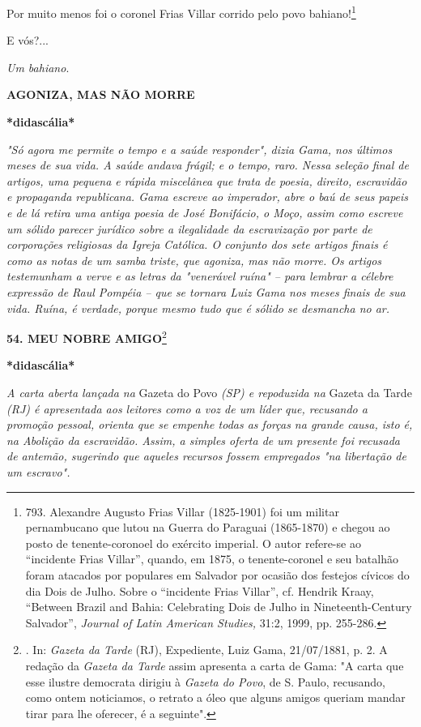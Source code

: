 Por muito menos foi o coronel Frias Villar corrido pelo povo
bahiano!\footnote{793. Alexandre Augusto Frias Villar (1825-1901) foi um
  militar pernambucano que lutou na Guerra do Paraguai (1865-1870) e
  chegou ao posto de tenente-coronoel do exército imperial. O autor
  refere-se ao ``incidente Frias Villar'', quando, em 1875, o
  tenente-coronel e seu batalhão foram atacados por populares em
  Salvador por ocasião dos festejos cívicos do dia Dois de Julho. Sobre
  o ``incidente Frias Villar'', cf. Hendrik Kraay, ``Between Brazil and
  Bahia: Celebrating Dois de Julho in Nineteenth-Century Salvador'',
  \emph{Journal of Latin American Studies,} 31:2, 1999, pp. 255-286.}

E vós?...

\emph{Um bahiano}.

\textbf{AGONIZA, MAS NÃO
MORRE}

\textbf{*didascália*}

\emph{"Só agora me permite o tempo e a saúde responder", dizia Gama, nos
últimos meses de sua vida. A saúde andava frágil; e o tempo, raro. Nessa
seleção final de artigos, uma pequena e rápida miscelânea que trata de
poesia, direito, escravidão e propaganda republicana. Gama escreve ao
imperador, abre o baú de seus papeis e de lá retira uma antiga poesia de
José Bonifácio, o Moço, assim como escreve um sólido parecer jurídico
sobre a ilegalidade da escravização por parte de corporações religiosas
da Igreja Católica. O conjunto dos sete artigos finais é como as notas
de um samba triste, que agoniza, mas não morre. Os artigos testemunham a
verve e as letras da "venerável ruína" -- para lembrar a célebre
expressão de Raul Pompéia -- que se tornara Luiz Gama nos meses finais
de sua vida. Ruína, é verdade, porque mesmo tudo que é sólido se
desmancha no ar.}

\textbf{54. MEU NOBRE AMIGO}\footnote{. In: \emph{Gazeta da Tarde} (RJ),
  Expediente, Luiz Gama, 21/07/1881, p. 2. A redação da \emph{Gazeta da
  Tarde} assim apresenta a carta de Gama: "A carta que esse ilustre
  democrata dirigiu à \emph{Gazeta do Povo}, de S. Paulo, recusando,
  como ontem noticiamos, o retrato a óleo que alguns amigos queriam
  mandar tirar para lhe oferecer, é a seguinte".}

\textbf{*}\textbf{didascália*}

\emph{A carta aberta lançada na} Gazeta do Povo \emph{(SP) e repoduzida
na} Gazeta da Tarde \emph{(RJ) é apresentada aos leitores como a voz de
um líder que, recusando a promoção pessoal, orienta que se empenhe todas
as forças na grande causa, isto é, na Abolição da escravidão. Assim, a
simples oferta de um presente foi recusada de antemão, sugerindo que
aqueles recursos fossem empregados "na libertação de um escravo". }

